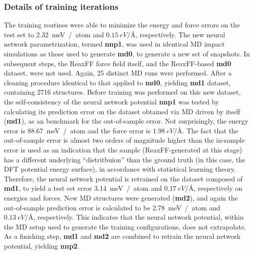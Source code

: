 \documentclass[manuscript=cmatex]{achemso}
\begin{document}
\subsubsection{Details of training iterations}
The training routines were able to minimize the energy and force errors on the test set to \SI{2.32}{meV / atom} and $\SI{0.15}{eV/\angstrom}$, respectively. The new neural network parametrization, termed \textbf{nnp1}, was used in identical MD impact simulations as those used to generate \textbf{md0}, to generate a new set of snapshots. In subsequent steps, the ReaxFF force field itself, and the ReaxFF-based \textbf{md0} dataset, were not used. Again, 25 distinct MD runs were performed. After a cleaning procedure identical to that applied to \textbf{md0}, yielding \textbf{md1} dataset, containing 2716 structures. Before training was performed on this new dataset, the self-consistency of the neural network potential \textbf{nnp1} was tested by calculating its prediction error on the dataset obtained via MD driven by itself (\textbf{md1}), as an benchmark for the out-of-sample error. Not surprisingly, the energy error is \SI{88.67}{meV / atom} and the force error is $\SI{1.98}{eV/\angstrom}$. The fact that the out-of-sample error is almost two orders of magnitude higher than the in-sample error is used as an indication that the sample (ReaxFF-generated at this stage) has a different underlying ``distritbuion'' than the ground truth (in this case, the DFT potential energy surface), in accordance with statistical learning theory. Therefore, the neural network potential is retrained on the dataset composed of \textbf{md1}, to yield a test set error \SI{3.14}{meV / atom} and $\SI{0.17}{eV/\angstrom}$, respectively on energies and forces. New MD structures were generated (\textbf{md2}), and again the out-of-sample prediction error is calculated to be \SI{2.78}{meV / atom} and $\SI{0.13}{eV/\angstrom}$, respectively. This indicates that the neural network potential, within the MD setup used to generate the training configurations, does not extrapolate. As a finishing step, \textbf{md1} and \textbf{md2} are combined to retrain the neural network potential, yielding \textbf{nnp2}. 
\end{document}
